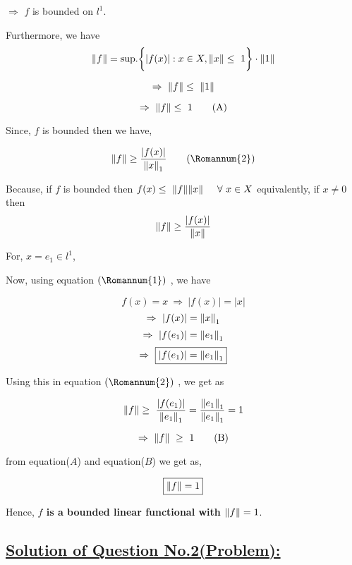 \documentclass[a4paper,12pt]{article}
\begin{document}
    $\Rightarrow$ $f$ is bounded on $l^1$.

    \vspace*{0.5cm}
    Furthermore, we have 
    \[\norm{f} = \mbox{sup.}\biggl\{|f(x)| : x\in X, \norm{x} \leq\ 1 \biggr\}\cdot \norm{1}\]

    \[\Rightarrow\ \norm{f} \leq\ \norm{1}\]

    \begin{equation*}
        \Rightarrow\ \norm{f} \leq\ 1 \tag*{(A)}
    \end{equation*}

    Since, $f$ is bounded then we have,

    \begin{equation*}
        \norm{f} \geq \frac{|f(x)|}{\norm{x}_1} \tag*{(\Romannum{2})}
    \end{equation*}

    \begin{tcolorbox}
        Because, if $f$ is bounded then $f(x) \leq\ \norm{f}\norm{x}\hspace*{0.5cm} \forall\ x\in X$ equivalently, if $x \neq 0$ then 
        \[\norm{f} \geq \frac{|f(x)|}{\norm{x}}\]
    \end{tcolorbox}

    For, $x = e_1\in l^1$,

    Now, using equation $(\Romannum{1})$ , we have
    
    \[f(x) = x\ \Rightarrow\ |f(x)| = |x|\]
    \[\Rightarrow\ |f(x)| = \norm{x}_1\]
    \[\Rightarrow\ |f(e_1)| = \norm{e_1}_1\]
    \[\Rightarrow\ \boxed{|f(e_1)| = \norm{e_1}_1}\]

    Using this in equation $(\Romannum{2})$ , we get as

    \[\norm{f} \geq\ \frac{|f(e_1)|}{\norm{e_1}_1} = \frac{\norm{e_1}_1}{\norm{e_1}_1} = 1\]
    
    \begin{equation*}
        \Rightarrow\ \norm{f}\ \geq\ 1 \tag*{(B)}
    \end{equation*}

    from equation($A$) and equation($B$) we get as,

    \[\boxed{\norm{f} = 1}\]

    Hence, {\bf $f$ is a bounded linear functional with $\norm{f} = 1$}.

    \pagebreak

    \subsection*{\underline{Solution of Question No.2(Problem):}}
\end{document}

